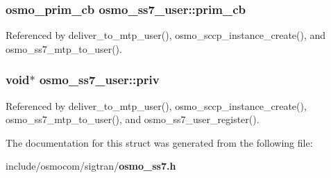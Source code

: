 \subsubsection[{prim\+\_\+cb}]{\setlength{\rightskip}{0pt plus 5cm}osmo\+\_\+prim\+\_\+cb osmo\+\_\+ss7\+\_\+user\+::prim\+\_\+cb}\label{structosmo__ss7__user_aa4a8d4f1db6560c6fe561e64b114dbce}


Referenced by deliver\+\_\+to\+\_\+mtp\+\_\+user(), osmo\+\_\+sccp\+\_\+instance\+\_\+create(), and osmo\+\_\+ss7\+\_\+mtp\+\_\+to\+\_\+user().

\subsubsection[{priv}]{\setlength{\rightskip}{0pt plus 5cm}void$\ast$ osmo\+\_\+ss7\+\_\+user\+::priv}\label{structosmo__ss7__user_ac64dc4683a58c080dc4532c563662948}


Referenced by deliver\+\_\+to\+\_\+mtp\+\_\+user(), osmo\+\_\+sccp\+\_\+instance\+\_\+create(), osmo\+\_\+ss7\+\_\+mtp\+\_\+to\+\_\+user(), and osmo\+\_\+ss7\+\_\+user\+\_\+register().



The documentation for this struct was generated from the following file\+:\begin{DoxyCompactItemize}
\item 
include/osmocom/sigtran/{\bf osmo\+\_\+ss7.\+h}\end{DoxyCompactItemize}
